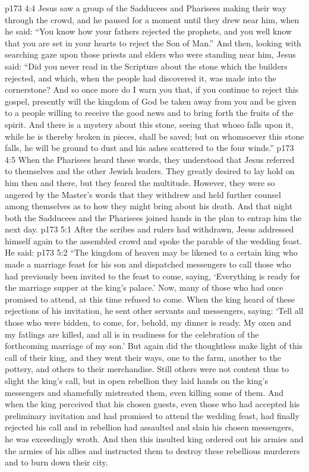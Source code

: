 \vs p173 4:4 Jesus saw a group of the Sadducees and Pharisees making their way through the crowd, and he paused for a moment until they drew near him, when he said: \textcolor{ubdarkred}{“You know how your fathers rejected the prophets, and you well know that you are set in your hearts to reject the Son of Man.”} And then, looking with searching gaze upon those priests and elders who were standing near him, Jesus said: \textcolor{ubdarkred}{“Did you never read in the Scripture about the stone which the builders rejected, and which, when the people had discovered it, was made into the cornerstone? And so once more do I warn you that, if you continue to reject this gospel, presently will the kingdom of God be taken away from you and be given to a people willing to receive the good news and to bring forth the fruits of the spirit. And there is a mystery about this stone, seeing that whoso falls upon it, while he is thereby broken in pieces, shall be saved; but on whomsoever this stone falls, he will be ground to dust and his ashes scattered to the four winds.”}
\vs p173 4:5 When the Pharisees heard these words, they understood that Jesus referred to themselves and the other Jewish leaders. They greatly desired to lay hold on him then and there, but they feared the multitude. However, they were so angered by the Master’s words that they withdrew and held further counsel among themselves as to how they might bring about his death. And that night both the Sadducees and the Pharisees joined hands in the plan to entrap him the next day.
\vs p173 5:1 After the scribes and rulers had withdrawn, Jesus addressed himself again to the assembled crowd and spoke the parable of the wedding feast. He said:
\vs p173 5:2 \pc \textcolor{ubdarkred}{“The kingdom of heaven may be likened to a certain king who made a marriage feast for his son and dispatched messengers to call those who had previously been invited to the feast to come, saying, ‘Everything is ready for the marriage supper at the king’s palace.’ Now, many of those who had once promised to attend, at this time refused to come. When the king heard of these rejections of his invitation, he sent other servants and messengers, saying: ‘Tell all those who were bidden, to come, for, behold, my dinner is ready. My oxen and my fatlings are killed, and all is in readiness for the celebration of the forthcoming marriage of my son.’ But again did the thoughtless make light of this call of their king, and they went their ways, one to the farm, another to the pottery, and others to their merchandise. Still others were not content thus to slight the king’s call, but in open rebellion they laid hands on the king’s messengers and shamefully mistreated them, even killing some of them. And when the king perceived that his chosen guests, even those who had accepted his preliminary invitation and had promised to attend the wedding feast, had finally rejected his call and in rebellion had assaulted and slain his chosen messengers, he was exceedingly wroth. And then this insulted king ordered out his armies and the armies of his allies and instructed them to destroy these rebellious murderers and to burn down their city.}
